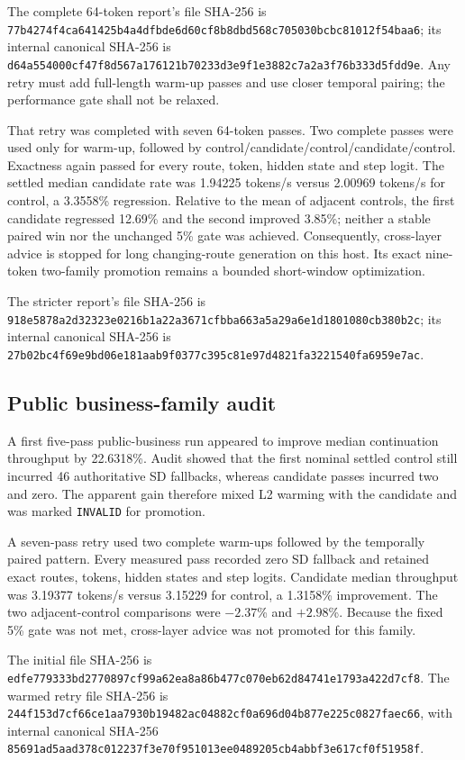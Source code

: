 The complete 64-token report's file SHA-256 is
\texttt{77b4274f4ca641425b4a4dfbde6d60cf8b8dbd568c705030bcbc81012f54baa6};
its internal canonical SHA-256 is
\texttt{d64a554000cf47f8d567a176121b70233d3e9f1e3882c7a2a3f76b333d5fdd9e}.
Any retry must add full-length warm-up passes and use closer temporal pairing;
the performance gate shall not be relaxed.

That retry was completed with seven 64-token passes.  Two complete passes were
used only for warm-up, followed by
control/candidate/control/candidate/control.  Exactness again passed for every
route, token, hidden state and step logit.  The settled median candidate rate
was 1.94225 tokens/s versus 2.00969 tokens/s for control, a 3.3558\%
regression.  Relative to the mean of adjacent controls, the first candidate
regressed 12.69\% and the second improved 3.85\%; neither a stable paired win
nor the unchanged 5\% gate was achieved.  Consequently, cross-layer advice is
stopped for long changing-route generation on this host.  Its exact
nine-token two-family promotion remains a bounded short-window optimization.

The stricter report's file SHA-256 is
\texttt{918e5878a2d32323e0216b1a22a3671cfbba663a5a29a6e1d1801080cb380b2c};
its internal canonical SHA-256 is
\texttt{27b02bc4f69e9bd06e181aab9f0377c395c81e97d4821fa3221540fa6959e7ac}.

\subsection{Public business-family audit}

A first five-pass public-business run appeared to improve median continuation
throughput by 22.6318\%.  Audit showed that the first nominal settled control
still incurred 46 authoritative SD fallbacks, whereas candidate passes
incurred two and zero.  The apparent gain therefore mixed L2 warming with the
candidate and was marked \texttt{INVALID} for promotion.

A seven-pass retry used two complete warm-ups followed by the temporally paired
pattern.  Every measured pass recorded zero SD fallback and retained exact
routes, tokens, hidden states and step logits.  Candidate median throughput was
3.19377 tokens/s versus 3.15229 for control, a 1.3158\% improvement.  The two
adjacent-control comparisons were $-2.37$\% and $+2.98$\%.  Because the fixed
5\% gate was not met, cross-layer advice was not promoted for this family.

The initial file SHA-256 is
\texttt{edfe779333bd2770897cf99a62ea8a86b477c070eb62d84741e1793a422d7cf8}.
The warmed retry file SHA-256 is
\texttt{244f153d7cf66ce1aa7930b19482ac04882cf0a696d04b877e225c0827faec66},
with internal canonical SHA-256
\texttt{85691ad5aad378c012237f3e70f951013ee0489205cb4abbf3e617cf0f51958f}.

